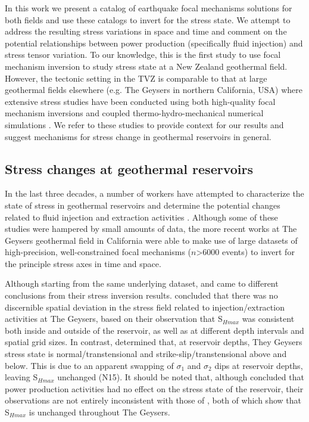 In this work we present a catalog of earthquake focal mechanisms solutions for both fields and use these catalogs to invert for the stress state. We attempt to address the resulting stress variations in space and time and comment on the potential relationships between power production (specifically fluid injection) and stress tensor variation. To our knowledge, this is the first study to use focal mechanism inversion to study stress state at a New Zealand geothermal field. However, the tectonic setting in the \acrshort{TVZ} is comparable to that at large geothermal fields elsewhere (e.g. The Geysers in northern California, USA) where extensive stress studies have been conducted using both high-quality focal mechanism inversions and coupled thermo-hydro-mechanical numerical simulations \citep[e.g.][]{Mart_nez_Garz_n_2013,Boyle_2014,Jeanne_2015tensor}. We refer to these studies to provide context for our results and suggest mechanisms for stress change in geothermal reservoirs in general.

\subsection{Stress changes at geothermal reservoirs}\label{stress_background}
In the last three decades, a number of workers have attempted to characterize the state of stress in geothermal reservoirs and determine the potential changes related to fluid injection and extraction activities \citep{oppenheimer1986extensional,feng1998microseismicity,sasaki2002determination,bohnhoff2004fault,Mart_nez_Garz_n_2013,Boyle_2014,Mart_nez_Garz_n_2014,Mart_nez_Garz_n_2017}. Although some of these studies were hampered by small amounts of data, the more recent works \citep[specifically][]{Mart_nez_Garz_n_2013,Boyle_2014,Mart_nez_Garz_n_2014,Mart_nez_Garz_n_2017} at The Geysers geothermal field in California were able to make use of large datasets of high-precision, well-constrained focal mechanisms ($n$\textgreater{6000} events) to invert for the principle stress axes in time and space.

Although starting from the same underlying dataset, \citet{Mart_nez_Garz_n_2013} and \citet{Boyle_2014} came to different conclusions from their stress inversion results. \citet{Boyle_2014} concluded that there was no discernible spatial deviation in the stress field related to injection\slash{extraction} activities at The Geysers, based on their observation that S$_{Hmax}$ was consistent both inside and outside of the reservoir, as well as at different depth intervals and spatial grid sizes. In contrast, \citet{Mart_nez_Garz_n_2013} determined that, at reservoir depths, They Geysers stress state is normal\slash{transtensional} and strike-slip\slash{transtensional} above and below. This is due to an apparent swapping of $\sigma_1$ and $\sigma_2$ dips at reservoir depths, leaving S$_{Hmax}$ unchanged (N15). It should be noted that, although \citet{Boyle_2014} concluded that power production activities had no effect on the stress state of the reservoir, their observations are not entirely inconsistent with those of \citet{Mart_nez_Garz_n_2013}, both of which show that S$_{Hmax}$ is unchanged throughout The Geysers.

